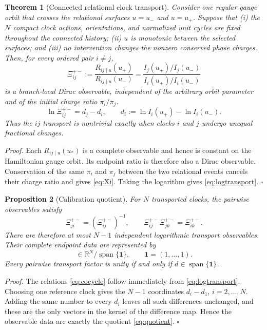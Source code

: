 \documentclass[11pt]{article}
\theoremstyle{plain}
\newtheorem{theorem}{Theorem}
\newtheorem{proposition}[theorem]{Proposition}
\newcommand{\QED}{\hfill$\square$}
\begin{document}
\begin{theorem}[Connected relational clock transport]
\label{thm:transport}
Consider one regular gauge orbit that crosses the relational surfaces
$u=u_-$ and $u=u_+$.  Suppose that (i) the $N$ compact clock actions,
orientations, and normalized unit cycles are fixed throughout the connected
history; (ii) $u$ is monotonic between the selected surfaces; and (iii) no
intervention changes the nonzero conserved phase charges.  Then, for every
ordered pair $i\ne j$,
\begin{equation}
\Xi_{ij}^{+-}:=
\frac{R_{ij\mid u}(u_+)}{R_{ij\mid u}(u_-)}
=\frac{I_j(u_+)/I_j(u_-)}{I_i(u_+)/I_i(u_-)}
\label{eq:Xi}
\end{equation}
is a branch-local Dirac observable, independent of the arbitrary orbit
parameter and of the initial charge ratio $\pi_i/\pi_j$.
\begin{equation}
 \ln\Xi_{ij}^{+-}=d_j-d_i,
 \qquad
 d_i:=\ln I_i(u_+)-\ln I_i(u_-).
 \label{eq:logtransport}
\end{equation}
Thus the $ij$ transport is nontrivial exactly when clocks $i$ and $j$ undergo
unequal fractional changes.
\end{theorem}
\noindent\emph{Proof.}
Each $R_{ij\mid u}(u_*)$ is a complete observable and hence is constant on
the Hamiltonian gauge orbit.  Its endpoint ratio is therefore also a Dirac
observable.  Conservation of the same $\pi_i$ and $\pi_j$ between the two
relational events cancels their charge ratio and gives \eqref{eq:Xi}.
Taking the logarithm gives \eqref{eq:logtransport}. \QED

\begin{proposition}[Calibration quotient]
\label{cor:quotient}
For $N$ transported clocks, the pairwise observables satisfy
\begin{equation}
 \Xi_{ji}^{+-}=(\Xi_{ij}^{+-})^{-1},
 \qquad
 \Xi_{ij}^{+-}\Xi_{jk}^{+-}=\Xi_{ik}^{+-}.
 \label{eq:cocycle}
\end{equation}
There are therefore at most $N-1$ independent logarithmic transport
observables.  Their complete endpoint data are represented by
\begin{equation}
 [d]\in\mathbb R^N/\operatorname{span}\{\boldsymbol 1\},
 \qquad
 \boldsymbol 1=(1,\ldots,1).
 \label{eq:quotient}
\end{equation}
Every pairwise transport factor is unity if and only if
$d\in\operatorname{span}\{\boldsymbol 1\}$.
\end{proposition}
\noindent\emph{Proof.}
The relations \eqref{eq:cocycle} follow immediately from
\eqref{eq:logtransport}.  Choosing one reference clock gives the $N-1$
coordinates $d_i-d_1$, $i=2,\ldots,N$.  Adding the same number to every
$d_i$ leaves all such differences unchanged, and these are the only vectors
in the kernel of the difference map.  Hence the observable data are exactly
the quotient \eqref{eq:quotient}. \QED
\end{document}
